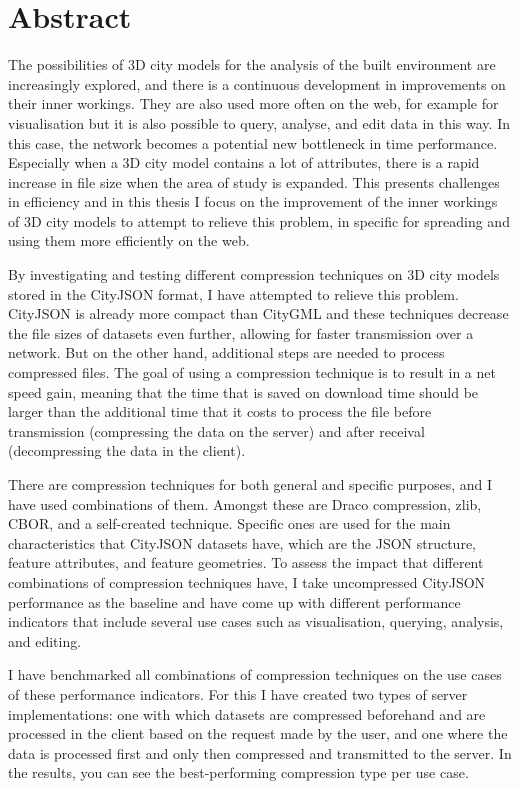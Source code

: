 
\chapter*{Abstract}

The possibilities of 3D city models for the analysis of the built environment are increasingly explored, and there is a continuous development in improvements on their inner workings.
They are also used more often on the web, for example for visualisation but it is also possible to query, analyse, and edit data in this way.
In this case, the network becomes a potential new bottleneck in time performance.
Especially when a 3D city model contains a lot of attributes, there is a rapid increase in file size when the area of study is expanded.
This presents challenges in efficiency and in this thesis I focus on the improvement of the inner workings of 3D city models to attempt to relieve this problem, in specific for spreading and using them more efficiently on the web.

By investigating and testing different compression techniques on 3D city models stored in the CityJSON format, I have attempted to relieve this problem.
CityJSON is already more compact than CityGML and these techniques decrease the file sizes of datasets even further, allowing for faster transmission over a network. 
But on the other hand, additional steps are needed to process compressed files.
The goal of using a compression technique is to result in a net speed gain, meaning that the time that is saved on download time should be larger than the additional time that it costs to process the file before transmission (compressing the data on the server) and after receival (decompressing the data in the client).

There are compression techniques for both general and specific purposes, and I have used combinations of them.
Amongst these are Draco compression, zlib, CBOR, and a self-created technique.
Specific ones are used for the main characteristics that CityJSON datasets have, which are the JSON structure, feature attributes, and feature geometries.
To assess the impact that different combinations of compression techniques have, I take uncompressed CityJSON performance as the baseline and have come up with different performance indicators that include several use cases such as visualisation, querying, analysis, and editing.

I have benchmarked all combinations of compression techniques on the use cases of these performance indicators.
For this I have created two types of server implementations: one with which datasets are compressed beforehand and are processed in the client based on the request made by the user, and one where the data is processed first and only then compressed and transmitted to the server.
In the results, you can see the best-performing compression type per use case.

